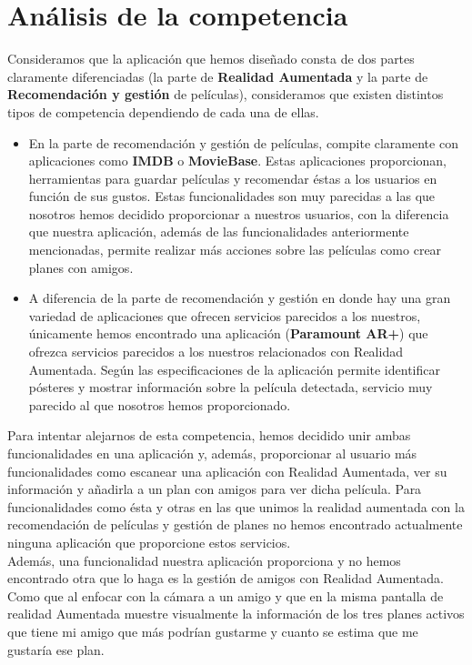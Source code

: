 \section{Análisis de la competencia}
\label{makereference2.4}
\begin{flushleft}
    Consideramos que la aplicación que hemos diseñado consta de dos partes claramente diferenciadas (la parte de \textbf{Realidad Aumentada} y la parte de \textbf{Recomendación y gestión} de películas), consideramos que existen distintos tipos de competencia dependiendo de cada una de ellas.
     \begin{itemize}  
         \item En la parte de recomendación y gestión de películas, compite claramente con aplicaciones como \textbf{IMDB} o \textbf{MovieBase}. Estas aplicaciones proporcionan, herramientas para guardar películas y recomendar éstas a los usuarios en función de sus gustos. Estas funcionalidades son muy parecidas a las que nosotros hemos decidido proporcionar a nuestros usuarios, con la diferencia que nuestra aplicación, además de las funcionalidades anteriormente mencionadas, permite realizar más acciones sobre las películas como crear planes con amigos.
        \item A diferencia de la parte de recomendación y gestión en donde hay una gran variedad de aplicaciones que ofrecen servicios parecidos a los nuestros, únicamente hemos encontrado una aplicación (\textbf{Paramount AR+}) que ofrezca servicios parecidos a los nuestros relacionados con Realidad Aumentada. Según las especificaciones de la aplicación permite identificar pósteres y mostrar información sobre la película detectada, servicio muy parecido al que nosotros hemos proporcionado. 
    \end{itemize}
    Para intentar alejarnos de esta competencia, hemos decidido unir ambas funcionalidades en una aplicación y, además, proporcionar al usuario más funcionalidades como escanear una aplicación con Realidad Aumentada, ver su información y añadirla a un plan con amigos para ver dicha película. Para funcionalidades como ésta y otras en las que unimos la realidad aumentada con la recomendación de películas y gestión de planes no hemos encontrado actualmente ninguna aplicación que proporcione estos servicios.
    \\
    Además, una funcionalidad nuestra aplicación proporciona y no hemos encontrado otra que lo haga es la gestión de amigos con Realidad Aumentada. Como que al enfocar con la cámara a un amigo y que en la misma pantalla de realidad Aumentada muestre visualmente la información de los tres planes activos que tiene mi amigo que más podrían gustarme y cuanto se estima que me gustaría ese plan.

\end{flushleft}
